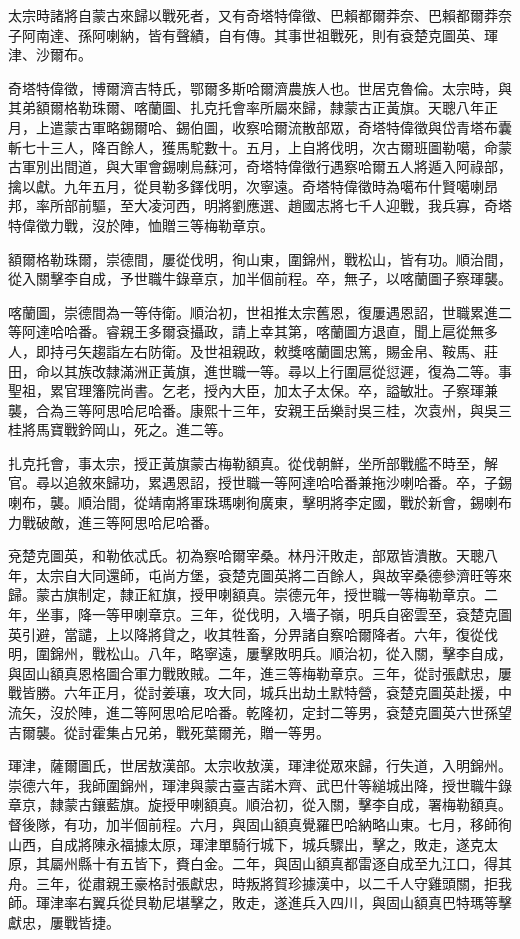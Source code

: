 \begin{pinyinscope}
太宗時諸將自蒙古來歸以戰死者，又有奇塔特偉徵、巴賴都爾莽奈、巴賴都爾莽奈子阿南達、孫阿喇納，皆有聲績，自有傳。其事世祖戰死，則有袞楚克圖英、琿津、沙爾布。

奇塔特偉徵，博爾濟吉特氏，鄂爾多斯哈爾濟農族人也。世居克魯倫。太宗時，與其弟額爾格勒珠爾、喀蘭圖、扎克托會率所屬來歸，隸蒙古正黃旗。天聰八年正月，上遣蒙古軍略錫爾哈、錫伯圖，收察哈爾流散部眾，奇塔特偉徵與岱青塔布囊斬七十三人，降百餘人，獲馬駝數十。五月，上自將伐明，次古爾班圖勒噶，命蒙古軍別出間道，與大軍會錫喇烏蘇河，奇塔特偉徵行遇察哈爾五人將遁入阿祿部，擒以獻。九年五月，從貝勒多鐸伐明，次寧遠。奇塔特偉徵時為噶布什賢噶喇昂邦，率所部前驅，至大凌河西，明將劉應選、趙國志將七千人迎戰，我兵寡，奇塔特偉徵力戰，沒於陣，恤贈三等梅勒章京。

額爾格勒珠爾，崇德間，屢從伐明，徇山東，圍錦州，戰松山，皆有功。順治間，從入關擊李自成，予世職牛錄章京，加半個前程。卒，無子，以喀蘭圖子察琿襲。

喀蘭圖，崇德間為一等侍衛。順治初，世祖推太宗舊恩，復屢遇恩詔，世職累進二等阿達哈哈番。睿親王多爾袞攝政，請上幸其第，喀蘭圖方退直，聞上扈從無多人，即持弓矢趨詣左右防衛。及世祖親政，敕獎喀蘭圖忠篤，賜金帛、鞍馬、莊田，命以其族改隸滿洲正黃旗，進世職一等。尋以上行圍扈從愆遲，復為二等。事聖祖，累官理籓院尚書。乞老，授內大臣，加太子太保。卒，謚敏壯。子察琿兼襲，合為三等阿思哈尼哈番。康熙十三年，安親王岳樂討吳三桂，次袁州，與吳三桂將馬寶戰鈐岡山，死之。進二等。

扎克托會，事太宗，授正黃旗蒙古梅勒額真。從伐朝鮮，坐所部戰艦不時至，解官。尋以追敘來歸功，累遇恩詔，授世職一等阿達哈哈番兼拖沙喇哈番。卒，子錫喇布，襲。順治間，從靖南將軍珠瑪喇徇廣東，擊明將李定國，戰於新會，錫喇布力戰破敵，進三等阿思哈尼哈番。

兗楚克圖英，和勒依忒氏。初為察哈爾宰桑。林丹汗敗走，部眾皆潰散。天聰八年，太宗自大同還師，屯尚方堡，袞楚克圖英將二百餘人，與故宰桑德參濟旺等來歸。蒙古旗制定，隸正紅旗，授甲喇額真。崇德元年，授世職一等梅勒章京。二年，坐事，降一等甲喇章京。三年，從伐明，入墻子嶺，明兵自密雲至，袞楚克圖英引避，當譴，上以降將貸之，收其牲畜，分畀諸自察哈爾降者。六年，復從伐明，圍錦州，戰松山。八年，略寧遠，屢擊敗明兵。順治初，從入關，擊李自成，與固山額真恩格圖合軍力戰敗賊。二年，進三等梅勒章京。三年，從討張獻忠，屢戰皆勝。六年正月，從討姜瓖，攻大同，城兵出劫土默特營，袞楚克圖英赴援，中流矢，沒於陣，進二等阿思哈尼哈番。乾隆初，定封二等男，袞楚克圖英六世孫望吉爾襲。從討霍集占兄弟，戰死葉爾羌，贈一等男。

琿津，薩爾圖氏，世居敖漢部。太宗收敖漢，琿津從眾來歸，行失道，入明錦州。崇德六年，我師圍錦州，琿津與蒙古臺吉諾木齊、武巴什等縋城出降，授世職牛錄章京，隸蒙古鑲藍旗。旋授甲喇額真。順治初，從入關，擊李自成，署梅勒額真。督後隊，有功，加半個前程。六月，與固山額真覺羅巴哈納略山東。七月，移師徇山西，自成將陳永福據太原，琿津單騎行城下，城兵驟出，擊之，敗走，遂克太原，其屬州縣十有五皆下，賚白金。二年，與固山額真都雷逐自成至九江口，得其舟。三年，從肅親王豪格討張獻忠，時叛將賀珍據漢中，以二千人守雞頭關，拒我師。琿津率右翼兵從貝勒尼堪擊之，敗走，遂進兵入四川，與固山額真巴特瑪等擊獻忠，屢戰皆捷。


\end{pinyinscope}
